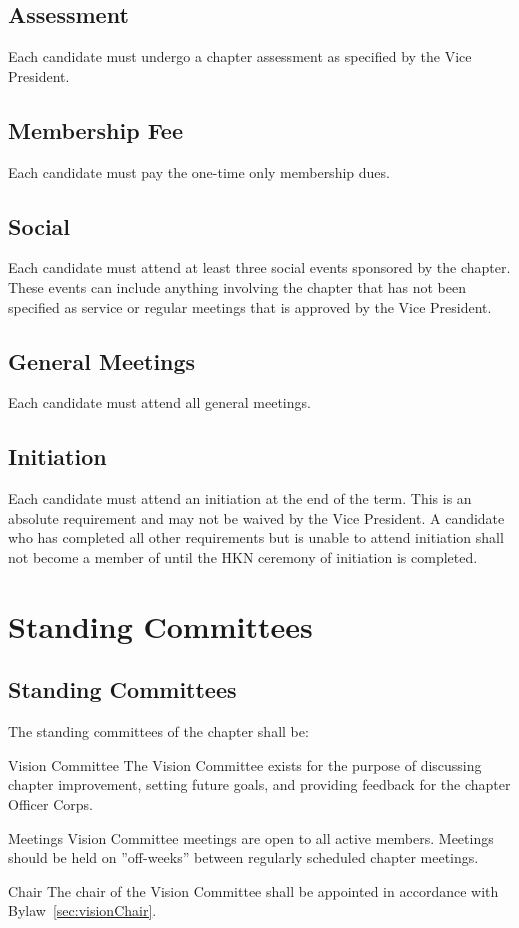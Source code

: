 \section{Assessment}
Each candidate must undergo a chapter assessment as specified by the Vice President.

\section{Membership Fee}
Each candidate must pay the one-time only membership dues.

\section{Social}
Each candidate must attend at least three social events sponsored by the chapter. These events can include anything involving the chapter that has not been specified as service or regular meetings that is approved by the Vice President.

\section{General Meetings}
Each candidate must attend all \hkn general meetings.  

\section{Initiation}
Each candidate must attend an \hkn initiation at the end of the term. This is an absolute requirement and may not be waived by the Vice President.  A candidate who has completed all other requirements but is unable to attend initiation shall not become a member of \hkn until the HKN ceremony of initiation is completed.


\chapter{Standing Committees}\label{app:standing}

\section{Standing Committees} The standing committees of the chapter shall be:
\begin{enumsubsection}
\item{Vision Committee} The Vision Committee exists for the purpose of discussing chapter improvement, setting future goals, and providing feedback for the chapter Officer Corps.
\begin{enumsubsubsection}
\item{Meetings} Vision Committee meetings are open to all active members. Meetings should be held on ''off-weeks'' between regularly scheduled chapter meetings.
\item{Chair} The chair of the Vision Committee shall be appointed in accordance with Bylaw~\ref{sec:visionChair}.
\end{enumsubsubsection}
\end{enumsubsection}

